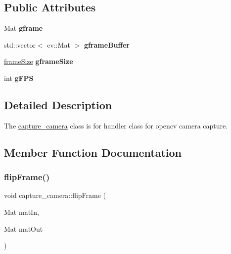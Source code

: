 \subsection*{Public Attributes}
\begin{DoxyCompactItemize}
\item 
\mbox{\label{classcapture__camera_a1ae6f9e1a58683cbb3a4ffec89456cda}} 
Mat {\bfseries gframe}
\item 
\mbox{\label{classcapture__camera_a3c117ceb7309589f542aa5da15bba81c}} 
std\+::vector$<$ cv\+::\+Mat $>$ {\bfseries gframe\+Buffer}
\item 
\mbox{\label{classcapture__camera_a13c4cdc768b826309c00255ecd612add}} 
\mbox{\hyperlink{structframe_size}{frame\+Size}} {\bfseries gframe\+Size}
\item 
\mbox{\label{classcapture__camera_a0765b6a387045c1555362e91a385bc4f}} 
int {\bfseries g\+F\+PS}
\end{DoxyCompactItemize}


\subsection{Detailed Description}
The \mbox{\hyperlink{classcapture__camera}{capture\+\_\+camera}} class is for handler class for opencv camera capture. 

\subsection{Member Function Documentation}
\mbox{\label{classcapture__camera_a4c624aa08561057ba402c8728f7693c5}} 
\subsubsection{\texorpdfstring{flip\+Frame()}{flipFrame()}}
{\footnotesize\ttfamily void capture\+\_\+camera\+::flip\+Frame (\begin{DoxyParamCaption}\item[{Mat}]{mat\+In,  }\item[{Mat}]{mat\+Out }\end{DoxyParamCaption})}



